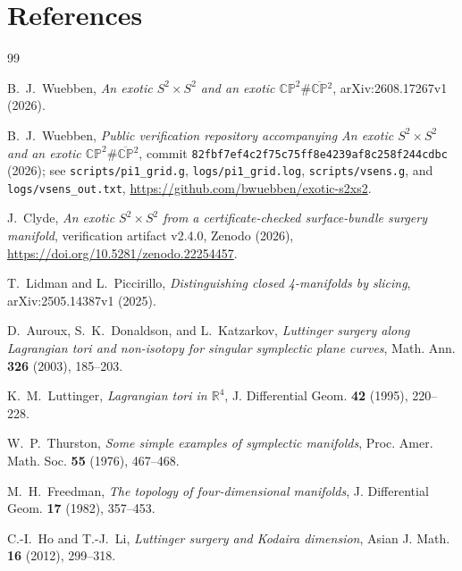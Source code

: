 \documentclass[11pt]{article}
\newcommand{\CP}{\mathbb{CP}}
\newcommand{\R}{\mathbb{R}}
\theoremstyle{definition}
\begin{document}
\section*{References}
\begingroup
\small
\linespread{1.02}\selectfont
\renewcommand{\section}[2]{}
\begin{thebibliography}{99}
\setlength{\itemsep}{.25em}
\setlength{\parsep}{0pt}

B.~J.~Wuebben,
\emph{An exotic $S^2\times S^2$ and an exotic
$\CP^2\#\overline{\CP}{}^2$},
arXiv:2608.17267v1 (2026).

B.~J.~Wuebben,
\emph{Public verification repository accompanying
An exotic $S^2\times S^2$ and an exotic
$\CP^2\#\overline{\CP}{}^2$},
commit \texttt{82fbf7ef4c2f75c75ff8e4239af8c258f244cdbc} (2026);
see \texttt{scripts/pi1\_grid.g}, \texttt{logs/pi1\_grid.log},
\texttt{scripts/vsens.g}, and \texttt{logs/vsens\_out.txt},
\url{https://github.com/bwuebben/exotic-s2xs2}.

J.~Clyde,
\emph{An exotic $S^2\times S^2$ from a certificate-checked surface-bundle surgery manifold},
verification artifact v2.4.0, Zenodo (2026),
\url{https://doi.org/10.5281/zenodo.22254457}.

T.~Lidman and L.~Piccirillo,
\emph{Distinguishing closed 4-manifolds by slicing},
arXiv:2505.14387v1 (2025).

D.~Auroux, S.~K.~Donaldson, and L.~Katzarkov,
\emph{Luttinger surgery along Lagrangian tori and non-isotopy for singular
symplectic plane curves},
Math. Ann. \textbf{326} (2003), 185--203.

K.~M.~Luttinger,
\emph{Lagrangian tori in $\R^4$},
J. Differential Geom. \textbf{42} (1995), 220--228.

W.~P.~Thurston,
\emph{Some simple examples of symplectic manifolds},
Proc. Amer. Math. Soc. \textbf{55} (1976), 467--468.

M.~H.~Freedman,
\emph{The topology of four-dimensional manifolds},
J. Differential Geom. \textbf{17} (1982), 357--453.

C.-I.~Ho and T.-J.~Li,
\emph{Luttinger surgery and Kodaira dimension},
Asian J. Math. \textbf{16} (2012), 299--318.


\end{thebibliography}
\end{document}
